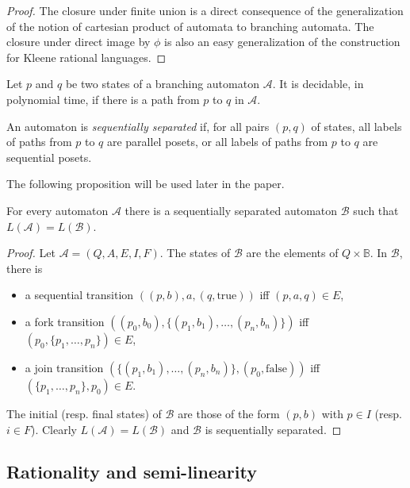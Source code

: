 \documentclass{CSML}
\newcommand{\true}{\text{true}}
\newcommand{\false}{\text{false}}
\begin{document}
\begin{proof}
  The closure under finite union is a direct consequence of the generalization of the notion of cartesian product of automata to branching automata. The closure under direct image by $\phi$ is also an easy generalization of the construction for Kleene rational languages.
\end{proof}

\begin{prop}\label{prop:findPath}
  Let $p$ and $q$ be two states of a branching automaton $\mathcal{A}$.
  It is decidable, in polynomial time, if there is a path from $p$ to $q$ in $\mathcal{A}$.
\end{prop}

An automaton is \emph{sequentially separated} if, for all pairs $(p,q)$ of states, all labels of paths from $p$ to $q$ are parallel posets, or all labels of paths from $p$ to $q$ are sequential posets.

The following proposition will be used later in the paper.
\begin{prop}
  \label{prop:seqSepAuto}
  For every automaton $\mathcal{A}$ there is a sequentially separated automaton $\mathcal{B}$ such that $L(\mathcal{A})=L(\mathcal{B})$.
\end{prop}

\begin{proof}
  Let $\mathcal{A}=(Q,A,E,I,F)$.
  The states of $\mathcal{B}$ are the elements of $Q\times\mathbb{B}$.
  In $\mathcal{B}$, there is 
  \begin{itemize}
    \item a sequential transition $((p,b),a,(q,\true))$ iff $(p,a,q)\in E$,
    \item a fork transition $((p_0,b_0),\{(p_1,b_1),\dots,(p_n,b_n)\})$ iff $(p_0,\{p_1,\dots,p_n\})\in E$,
    \item a join transition $(\{(p_1,b_1),\dots,(p_n,b_n)\},(p_0,\false))$ iff $(\{p_1,\dots,p_n\},p_0)\in E$.
  \end{itemize}
  The initial (resp. final states) of $\mathcal{B}$ are those of the form $(p,b)$ with $p\in I$ (resp. $i\in F$).
  Clearly $L(\mathcal{A})=L(\mathcal{B})$ and $\mathcal{B}$ is sequentially separated.
\end{proof}

\subsection{Rationality and semi-linearity}
\label{subsec:ratSemiLin}
\end{document}
